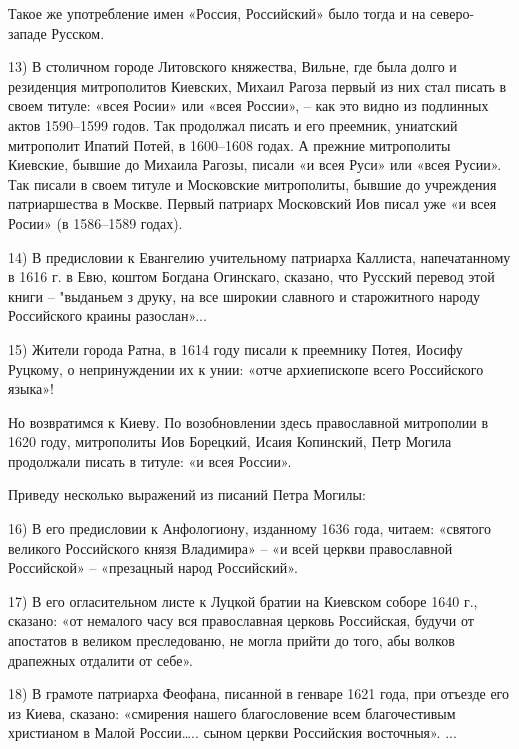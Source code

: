 Такое же употребление имен «Россия, Российский» было тогда и на северо-западе
Русском.

13) В столичном городе Литовского княжества, Вильне, где была долго и
резиденция митрополитов Киевских, Михаил Рагоза первый из них стал писать в
своем титуле: «всея Росии» или «всея России», – как это видно из подлинных
актов 1590–1599 годов. Так продолжал писать и его преемник, униатский
митрополит Ипатий Потей, в 1600–1608 годах. А прежние митрополиты Киевские,
бывшие до Михаила Рагозы, писали «и всея Руси» или «всея Русии». Так писали в
своем титуле и Московские митрополиты, бывшие до учреждения патриаршества в
Москве. Первый патриарх Московский Иов писал уже «и всея Росии» (в 1586–1589
годах).

14) В предисловии к Евангелию учительному патриарха Каллиста, напечатанному в
1616 г. в Евю, коштом Богдана Огинскаго, сказано, что Русский перевод этой
книги – "выданьем з друку, на все широкии славного и старожитного народу
Российского краины разослан»...

15) Жители города Ратна, в 1614 году писали к преемнику Потея, Иосифу Руцкому,
о непринуждении их к унии: «отче архиепископе всего Российского языка»!

Но возвратимся к Киеву. По возобновлении здесь православной митрополии в 1620
году, митрополиты Иов Борецкий, Исаия Копинский, Петр Могила продолжали писать
в титуле: «и всея России».

Приведу несколько выражений из писаний Петра Могилы:

16) В его предисловии к Анфологиону, изданному 1636 года, читаем: «святого
великого Российского князя Владимира» – «и всей церкви православной Российской»
– «презацный народ Российский».

17) В его огласительном листе к Луцкой братии на Киевском соборе 1640 г.,
сказано: «от немалого часу вся православная церковь Российская, будучи от
апостатов в великом преследованю, не могла прийти до того, абы волков драпежных
отдалити от себе».

18)  В грамоте патриарха Феофана, писанной в генваре 1621 года, при отъезде его
из Киева, сказано: «смирения нашего благословение всем благочестивым христианом
в Малой России….. сыном церкви Российския восточныя». ...
